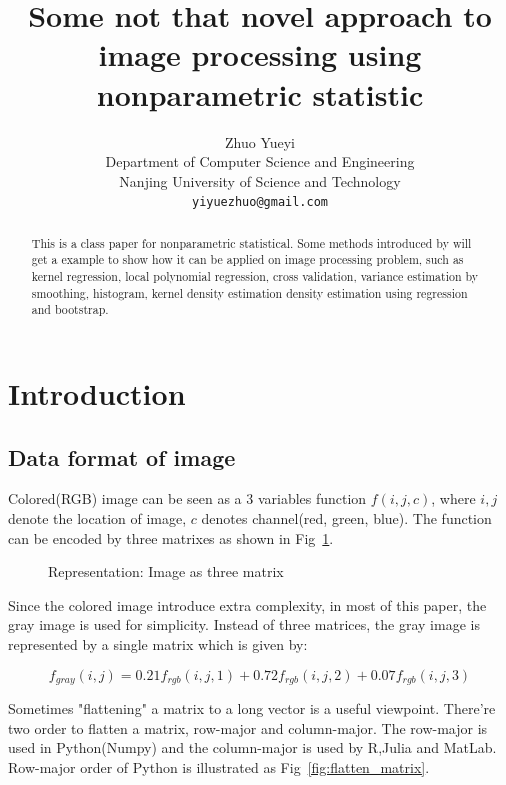 \documentclass{article}
\title{Some not that novel approach to image processing using nonparametric statistic}
\author{
  Zhuo Yueyi \\ %
  Department of Computer Science and Engineering\\
  Nanjing University of Science and Technology\\
  \texttt{yiyuezhuo@gmail.com} \\
}
\begin{document}
\tableofcontents
\newpage

\maketitle

\begin{abstract}
This is a class paper for nonparametric statistical. 
Some methods introduced by \cite{wasserman2006all} will get a example to show how it can be applied on
image processing problem, such as kernel regression, local polynomial regression, cross validation, variance estimation
by smoothing, histogram, kernel density estimation density estimation using regression and bootstrap.
\end{abstract}




\section{Introduction}




\subsection{Data format of image}

Colored(RGB) image can be seen as a 3 variables function  $f(i,j,c)$, where $i,j$ denote the location of image, $c$ denotes
channel(red, green, blue). The function can be encoded by three matrixes as shown in Fig~\ref{fig:toad_rgb}.

\begin{figure}[htb]
  \centering
  
  \caption{Representation: Image as three matrix}
  \label{fig:toad_rgb}
\end{figure}

Since the colored image introduce extra complexity, in most of this paper, the gray image is used for simplicity.
Instead of three matrices, the gray image is represented by a single matrix which is given by:

\begin{equation}
  f_{gray}(i,j) = 0.21 f_{rgb}(i,j,1) + 0.72 f_{rgb}(i,j,2) + 0.07 f_{rgb}(i,j,3)
  \label{eq:rgb_to_gray}
\end{equation}

Sometimes "flattening" a matrix to a long vector is a useful viewpoint. There're two order to flatten a matrix,
row-major and column-major. The row-major is used in Python(Numpy) and the column-major is used by R,Julia and MatLab.
Row-major order of Python is illustrated as Fig~\ref{fig:flatten_matrix}.
\end{document}
